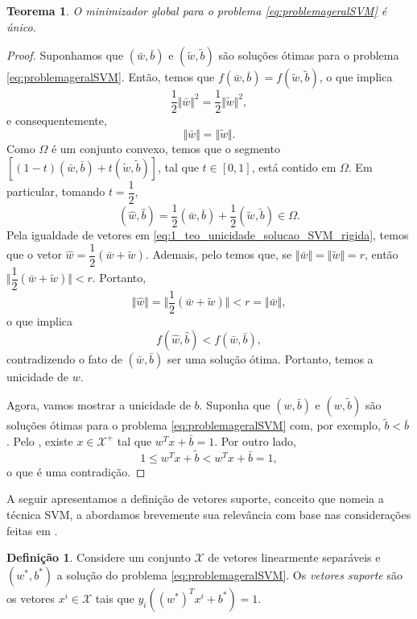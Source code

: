 \documentclass[12pt,a4paper]{scrartcl}
\def\Xset{\mathcal{X}}
\newtheorem{teo}{Teorema}
\theoremstyle{definition}%
\newtheorem{defi}{Definição}
\begin{document}
\begin{teo} \label{teo:unicidade_solucao_problema_SVM_margem_rigida}
O minimizador global para o problema \eqref{eq:problemageralSVM} é único.
\end{teo}
\begin{proof}
Suponhamos que $(\bar{w}, \bar{b})$ e $(\tilde{w}, \tilde{b})$ são soluções ótimas para o problema \eqref{eq:problemageralSVM}. Então, temos que $f(\bar{w}, \bar{b}) = f(\tilde{w}, \tilde{b})$, o que implica 
\[
\dfrac{1}{2}\Vert \bar{w} \Vert^{2} = \dfrac{1}{2}\Vert \tilde{w} \Vert^{2},
\]
e consequentemente, 
\[
\Vert \bar{w} \Vert = \Vert \tilde{w} \Vert .
\]
Como $\Omega$ é um conjunto convexo, temos que o segmento $[(1-t)(\bar{w}, \bar{b}) + t(\tilde{w}, \tilde{b})]$, tal que $t\in [0,1]$, está contido em $\Omega$. Em particular, tomando $t=\dfrac{1}{2}$,
\[ \label{eq:1_teo_unicidade_solucao_SVM_rigida}
(\hat{w}, \hat{b}) = \dfrac{1}{2}(\bar{w}, \bar{b}) + \dfrac{1}{2}(\tilde{w}, \tilde{b}) \in \Omega .
\]
Pela igualdade de vetores em \eqref{eq:1_teo_unicidade_solucao_SVM_rigida}, temos que o vetor $\hat{w} = \dfrac{1}{2}(\bar{w} + \tilde{w})$. Ademais, pelo  temos que, se $\Vert \bar{w} \Vert = \Vert \tilde{w} \Vert = r$, então $\Vert \dfrac{1}{2}(\bar{w} + \tilde{w}) \Vert  < r$. Portanto,
\[
\Vert \hat{w} \Vert = \Vert \dfrac{1}{2}(\bar{w} + \tilde{w}) \Vert < r = \Vert \bar{w} \Vert ,
\]
o que implica 
\[
f(\hat{w}, \hat{b}) < f(\bar{w}, \bar{b}),
\]
contradizendo o fato de $(\bar{w}, \bar{b})$ ser uma solução ótima. Portanto, temos a unicidade de $w$.

Agora, vamos mostrar a unicidade de $b$. Suponha que $(w, \bar{b})$ e $(w, \tilde{b})$ são soluções ótimas para o problema \eqref{eq:problemageralSVM} com, por exemplo, $\tilde{b} < \bar{b}$. Pelo , existe $x \in \Xset^{+}$ tal que $w^{T}x + \bar{b} = 1$. Por outro lado, 
\[
1 \leq w^{T}x + \tilde{b} < w^{T}x + \bar{b} = 1,
\]
o que é uma contradição.
\end{proof}

A seguir apresentamos a definição de vetores suporte, conceito que nomeia a técnica SVM, a abordamos brevemente sua relevância com base nas considerações feitas em \cite{Evelin2017,bishop2016pattern}.

\begin{defi} \label{defi:vetores_suporte}
Considere um conjunto $\Xset$ de vetores linearmente separáveis e $(w^{*}, b^{*})$ a solução do problema \eqref{eq:problemageralSVM}. Os \emph{vetores suporte} são os vetores $x^{i} \in \Xset$ tais que $y_{i}((w^{*})^{T} x^{i} + b^{*}) = 1$.
\end{defi}
\end{document}

